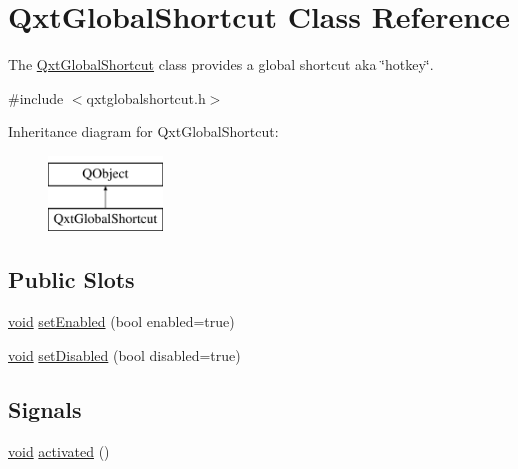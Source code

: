 \hypertarget{class_qxt_global_shortcut}{\section{Qxt\-Global\-Shortcut Class Reference}
\label{class_qxt_global_shortcut}
}


The \hyperlink{class_qxt_global_shortcut}{Qxt\-Global\-Shortcut} class provides a global shortcut aka \char`\"{}hotkey\char`\"{}.  




{\ttfamily \#include $<$qxtglobalshortcut.\-h$>$}

Inheritance diagram for Qxt\-Global\-Shortcut\-:\begin{figure}[H]
\begin{center}
\leavevmode
\includegraphics[height=2.000000cm]{class_qxt_global_shortcut}
\end{center}
\end{figure}
\subsection*{Public Slots}
\begin{DoxyCompactItemize}
\item 
\hyperlink{group___u_a_v_objects_plugin_ga444cf2ff3f0ecbe028adce838d373f5c}{void} \hyperlink{class_qxt_global_shortcut_a470a6799146d1693a23140ca55edbea6}{set\-Enabled} (bool enabled=true)
\item 
\hyperlink{group___u_a_v_objects_plugin_ga444cf2ff3f0ecbe028adce838d373f5c}{void} \hyperlink{class_qxt_global_shortcut_afd5563a5b2b9b63b18ed7e3e7b67e048}{set\-Disabled} (bool disabled=true)
\end{DoxyCompactItemize}
\subsection*{Signals}
\begin{DoxyCompactItemize}
\item 
\hyperlink{group___u_a_v_objects_plugin_ga444cf2ff3f0ecbe028adce838d373f5c}{void} \hyperlink{class_qxt_global_shortcut_ae5048554f63055a79bc708e231cb8818}{activated} ()
\end{DoxyCompactItemize}


